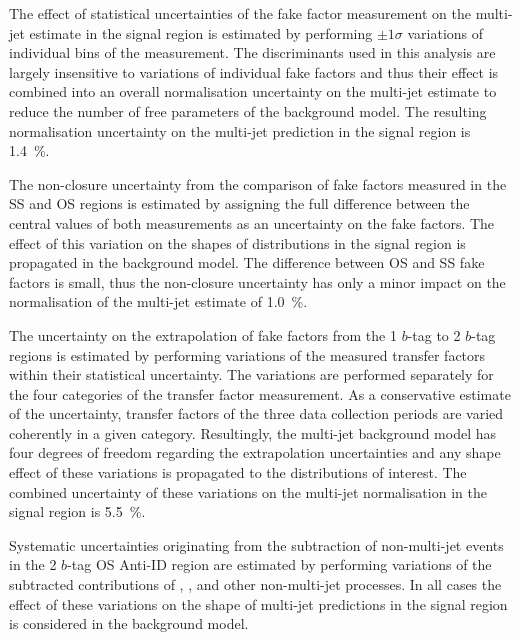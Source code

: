 The effect of statistical uncertainties of the fake factor measurement
on the multi-jet estimate in the signal region is estimated by
performing $\pm 1 \sigma$ variations of individual bins of the
measurement. The discriminants used in this analysis are largely
insensitive to variations of individual fake factors and thus their
effect is combined into an overall normalisation uncertainty on the
multi-jet estimate to reduce the number of free parameters of the
background model. The resulting normalisation uncertainty on the
multi-jet prediction in the signal region is \SI{1.4}{\percent}.

The non-closure uncertainty from the comparison of fake factors
measured in the SS and OS regions is estimated by assigning the full
difference between the central values of both measurements as an
uncertainty on the fake factors. The effect of this variation on the
shapes of distributions in the signal region is propagated in the
background model. The difference between OS and SS fake factors is
small, thus the non-closure uncertainty has only a minor impact on the
normalisation of the multi-jet estimate of \SI{1.0}{\percent}.

The uncertainty on the extrapolation of fake factors from the 1
$b$-tag to 2 $b$-tag regions is estimated by performing variations of
the measured transfer factors within their statistical
uncertainty. The variations are performed separately for the four
categories of the transfer factor measurement. As a conservative
estimate of the uncertainty, transfer factors of the three data
collection periods are varied coherently in a given
category. Resultingly, the multi-jet background model has four degrees
of freedom regarding the extrapolation uncertainties and any shape
effect of these variations is propagated to the distributions of
interest. The combined uncertainty of these variations on the
multi-jet normalisation in the signal region is \SI{5.5}{\percent}.

Systematic uncertainties originating from the subtraction of
non-multi-jet events in the 2 $b$-tag OS Anti-ID region are estimated
by performing variations of the subtracted contributions of
\ttbarTrue, \ttbarFakes, and other non-multi-jet processes. In all
cases the effect of these variations on the shape of multi-jet
predictions in the signal region is considered in the background
model.


